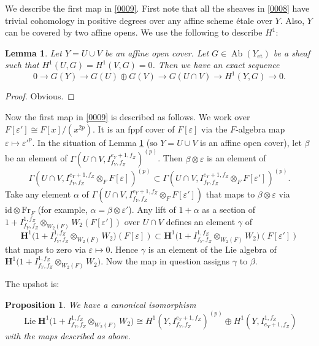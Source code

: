\documentclass{amsart}
\newtheorem{Prop}[Thm]{Proposition}
\newtheorem{Lem}[Thm]{Lemma}
\theoremstyle{remark}
\numberwithin{equation}{section}
\newcommand{\tensor}{\mathbin{\otimes}}
\newcommand{\et}{\mathrm{et}}
\newcommand{\id}{\mathrm{id}}
\newcommand{\alg}[1]{\mathbf{#1}}
\newcommand{\Frob}{\mathrm{Fr}}
\DeclareMathOperator{\Ab}{Ab}
\DeclareMathOperator{\Lie}{Lie}
\begin{document}
We describe the first map in \eqref{0009}.
First note that all the sheaves in \eqref{0008} have
trivial cohomology in positive degrees over any affine scheme \'etale over $Y$.
Also, $Y$ can be covered by two affine opens.
We use the following to describe $H^{1}$:

\begin{Lem} \label{0019}
	Let $Y = U \cup V$ be an affine open cover.
	Let $G \in \Ab(Y_{\et})$ be a sheaf such that
	$H^{1}(U, G) = H^{1}(V, G) = 0$.
	Then we have an exact sequence
		\[
				0
			\to
				G(Y)
			\to
				G(U) \oplus G(V)
			\to
				G(U \cap V)
			\to
				H^{1}(Y, G)
			\to
				0.
		\]
\end{Lem}

\begin{proof}
	Obvious.
\end{proof}

Now the first map in \eqref{0009} is described as follows.
We work over $F[\varepsilon'] \cong F[x] / (x^{2 p})$.
It is an fppf cover of $F[\varepsilon]$
via the $F$-algebra map $\varepsilon \mapsto \varepsilon'^{p}$.
In the situation of Lemma \ref{0019} (so $Y = U \cup V$ is an affine open cover),
let $\beta$ be an element of $\Gamma(U \cap V, I^{e_{Y} + 1, f_{Z}}_{f_{Y}, f_{Z}})^{(p)}$.
Then $\beta \tensor \varepsilon$ is an element of
	\[
			\Gamma(U \cap V, I^{e_{Y} + 1, f_{Z}}_{f_{Y}, f_{Z}} \tensor_{F} F[\varepsilon])^{(p)}
		\subset
			\Gamma(U \cap V, I^{e_{Y} + 1, f_{Z}}_{f_{Y}, f_{Z}} \tensor_{F} F[\varepsilon'])^{(p)}.
	\]
Take any element $\alpha$ of
$\Gamma(U \cap V, I^{e_{Y} + 1, f_{Z}}_{f_{Y}, f_{Z}} \tensor_{F} F[\varepsilon'])$
that maps to $\beta \tensor \varepsilon$ via $\id \tensor \Frob_{F}$
(for example, $\alpha = \beta \tensor \varepsilon'$).
Any lift of $1 + \alpha$ as a section of
	$
			1
		+		I^{1, f_{Z}}_{f_{Y}, f_{Z}}
			\tensor_{W_{2}(F)}
				W_{2}(F[\varepsilon'])
	$
over $U \cap V$ defines an element $\gamma$ of
	\[
			\alg{H}^{1} \bigl(
					1
				+
					I^{1, f_{Z}}_{f_{Y}, f_{Z}}
				\tensor_{W_{2}(F)}
					W_{2}
			\bigr)(F[\varepsilon])
		\subset
			\alg{H}^{1} \bigl(
					1
				+
					I^{1, f_{Z}}_{f_{Y}, f_{Z}}
				\tensor_{W_{2}(F)}
					W_{2}
			\bigr)(F[\varepsilon'])
	\]
that maps to zero via $\varepsilon \mapsto 0$.
Hence $\gamma$ is an element of the Lie algebra of
	$
		\alg{H}^{1} \bigl(
				1
			+
				I^{1, f_{Z}}_{f_{Y}, f_{Z}}
			\tensor_{W_{2}(F)}
				W_{2}
		\bigr)
	$.
Now the map in question assigns $\gamma$ to $\beta$.

The upshot is:
\begin{Prop} \label{0013}
	We have a canonical isomorphism
		\[
				\Lie
				\alg{H}^{1} \bigl(
						1
					+
						I^{1, f_{Z}}_{f_{Y}, f_{Z}}
					\tensor_{W_{2}(F)}
						W_{2}
				\bigr)
			\cong
					H^{1}(Y, I^{e_{Y} + 1, f_{Z}}_{f_{Y}, f_{Z}})^{(p)}
				\oplus
					H^{1}(Y, I^{1, f_{Z}}_{e_{Y} + 1, f_{Z}})
		\]
	with the maps described as above.
\end{Prop}
\end{document}
